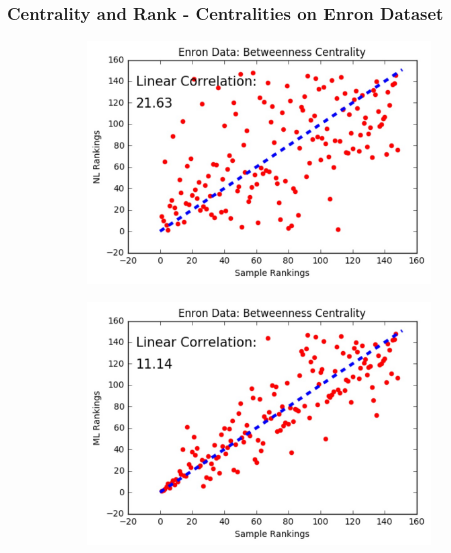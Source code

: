 \documentclass[9pt]{beamer}
\begin{document}
\begin{frame}
\frametitle{Centrality and Rank - Centralities on Enron Dataset}
\vspace{0.15in}
\begin{figure}[H]
\centering
\begin{subfigure}{.32\textwidth}
  \centering
  \includegraphics[width=0.95\linewidth]{EBC_NL.jpeg}
\end{subfigure}
\begin{subfigure}{.32\textwidth}
	\centering
    \includegraphics[width=0.95\linewidth]{EBC_ML.jpeg}
\end{subfigure}
\begin{subfigure}{.32\textwidth}

\end{subfigure}
\end{figure}
\end{frame}
\end{document}
